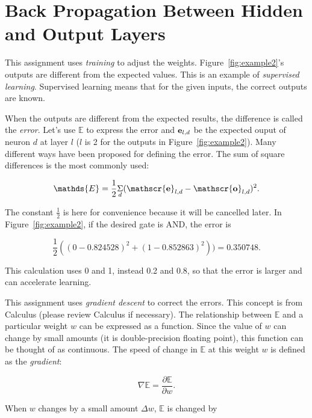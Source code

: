 \section{Back Propagation Between Hidden and Output Layers}

This assignment uses {\it training} to adjust the weights.
Figure~\ref{fig:example2}'s outputs are different from the expected
values.  This is an example of {\it supervised learning}.  Supervised
learning means that for the given inputs, the correct outputs are
known.

When the outputs are different from the expected results, the
difference is called the {\it error}.  Let's use $\mathds{E}$ to
express the error and $\mathscr {\bf e}_{l, d}$ be the expected ouput
of neuron $d$ at layer $l$ ($l$ is 2 for the outputs in
Figure~\ref{fig:example2}).  Many different ways have been proposed
for defining the error. The sum of square differences is the most
commonly used:

\begin{equation}
\mathds{E} =
\frac{1}{2} \underset{d}{ \Sigma} (\mathscr {\bf e}_{l, d}
- \mathscr {\bf o}_{l, d})^2.
\label{eqn:error}
\end{equation}

The constant $\frac{1}{2}$ is here for convenience because it will be
cancelled later.  In Figure~\ref{fig:example2}, if the desired gate is
AND, the error is

\begin{equation}
\frac{1}{2} ((0 -  0.824528) ^ 2 + (1 - 0.852863)^2)) = 0.350748.
\end{equation}

This calculation uses 0 and 1, instead 0.2 and 0.8, so that the error
is larger and can accelerate learning.

This assignment uses {\it gradient descent} to correct the errors.
This concept is from Calculus (please review Calculus if necessary).
The relationship between $\mathds{E}$ and a particular weight $w$ can
be expressed as a function.  Since the value of $w$ can change by
small amounts (it is double-precision floating point), this function
can be thought of as continuous.  The speed of change in $\mathds{E}$
at this weight $w$ is defined as the {\it gradient}:

\begin{equation}
\nabla \mathds{E} = \frac{\partial \mathds{E}}{\partial w}.
\end{equation}

When $w$ changes by a small amount $\Delta w$,
$\mathds{E}$ is changed by

